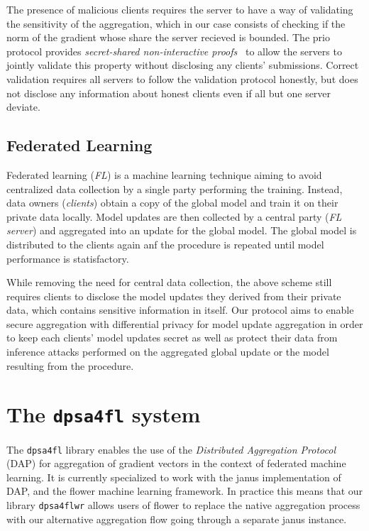 \documentclass{article}
\begin{document}
The presence of malicious clients requires the server to have a way of validating the sensitivity of the aggregation, which in our case consists of checking if the norm of the gradient whose share the server recieved is bounded. The prio protocol provides \textit{secret-shared non-interactive proofs}~\cite[Section 4]{prio} to allow the servers to jointly validate this property without disclosing any clients' submissions. Correct validation requires all servers to follow the validation protocol honestly, but does not disclose any information about honest clients even if all but one server deviate.

\subsection{Federated Learning}
Federated learning (\textit{FL}) is a machine learning technique aiming to avoid centralized data collection by a single party performing the training. Instead, data owners (\textit{clients}) obtain a copy of the global model and train it on their private data locally. Model updates are then collected by a central party (\textit{FL server}) and aggregated into an update for the global model. The global model is distributed to the clients again anf the procedure is repeated until model performance is statisfactory.

While removing the need for central data collection, the above scheme still requires clients to disclose the model updates they derived from their private data, which contains sensitive information in itself. Our protocol aims to enable secure aggregation with differential privacy for model update aggregation in order to keep each clients' model updates secret as well as protect their data from inference attacks performed on the aggregated global update or the model resulting from the procedure.


\section{The \texttt{dpsa4fl} system}
The \texttt{dpsa4fl} library enables the use of the \textit{Distributed Aggregation Protocol} (DAP) for
aggregation of gradient vectors in the context of federated machine learning. It
is currently specialized to work with the janus implementation of DAP,
and the flower machine learning framework.
In practice this means that our library \texttt{dpsa4flwr} allows users of flower
to replace the native aggregation process with our alternative aggregation flow
going through a separate janus instance.
\end{document}
